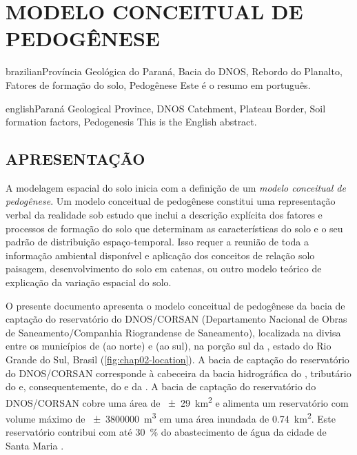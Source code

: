 \artigotrue
\chapter{MODELO CONCEITUAL DE PEDOGÊNESE}
\label{chap:chap02}


\def\ptkeys{Província Geológica do Paraná, Bacia do DNOS, Rebordo do Planalto, Fatores de formação do solo, 
Pedogênese}

\begin{chapterabstract}{brazilian}{\ptkeys}
 Este é o resumo em português.
\end{chapterabstract}

\def\enkeys{Paraná Geological Province, DNOS Catchment, Plateau Border, Soil formation factors, Pedogenesis}
  
\begin{chapterabstract}{english}{\enkeys}
 This is the English abstract.
\end{chapterabstract}

\formatchapter

\section{APRESENTAÇÃO}
\label{sec:chap02-apresentacao}


A modelagem espacial do solo inicia com a definição de um \emph{modelo conceitual de pedogênese}. Um modelo 
conceitual de pedogênese constitui uma representação verbal da realidade sob estudo que inclui a descrição 
explícita dos fatores e processos de formação do solo que determinam as características do solo e o seu padrão 
de distribuição espaço-temporal. Isso requer a reunião de toda a informação ambiental disponível e aplicação 
dos conceitos de relação solo paisagem, desenvolvimento do solo em catenas, ou outro modelo teórico de 
explicação da variação espacial do solo.

O presente documento apresenta o modelo conceitual de pedogênese da bacia de captação do reservatório do 
DNOS/CORSAN (Departamento Nacional de Obras de Saneamento/Companhia Riograndense de Saneamento), localizada na 
divisa entre os municípios de \itaara{} (ao norte) e \santamaria{} (ao sul), na porção sul da \baciaparana{},
estado do Rio Grande do Sul, Brasil (\autoref{fig:chap02-location}). A bacia de captação do reservatório do 
DNOS/CORSAN corresponde à cabeceira da bacia hidrográfica do \riovacacaimirim{}, tributário do \riojacui{} e, 
consequentemente, do \rioguaiba{} e da \lagoadospatos{}. A bacia de captação do reservatório do DNOS/CORSAN
cobre uma área de \SI{\pm29}{\square\kilo\metre} e alimenta um reservatório com volume máximo 
de \SI{\pm3800000}{\cubic\metre} em uma área inundada de \SI{0,74}{\square\kilo\metre}. Este reservatório 
contribui com até \SI{30}{\percent} do abastecimento de água da cidade de Santa Maria \cite{Dias2003, 
DillEtAl2004, Miguel2010}.

